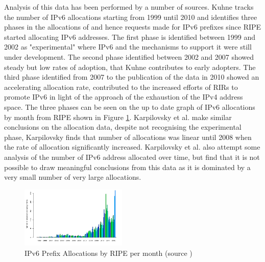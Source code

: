 Analysis of this data has been performed by a number of sources. Kuhne tracks
the number of IPv6 allocations starting from 1999 until 2010 and identifies three
phases in the allocations of and hence requests made for IPv6 prefixes since
RIPE started allocating IPv6 addresses\cite{kuhne_interesting_2010}.
The first phase is identified between 1999 and
2002 as "experimental" where IPv6 and the mechanisms to support it were still
under development. The second phase identified between 2002 and 2007 showed
steady but low rates of adoption, that Kuhne contributes to early adopters. The
third phase identified from 2007 to the publication of the data in 2010 showed
an accelerating allocation rate, contributed to the increased efforts of RIRs
to promote IPv6 in light of the approach of the exhaustion of the IPv4 address
space. The three phases can be seen on the up to date graph of IPv6 allocations
by month from RIPE shown in Figure \ref{fig:alloc-month}. Karpilovsky et al. make
similar conclusions on the allocation data, despite not recognising the
experimental phase, Karpilovsky finds that number of allocations was linear
until 2008 when the rate of allocation significantly increased\cite{karpilovsky_quantifying_2009}.
Karpilovsky et
al. also attempt some analysis of the number of IPv6 address allocated over
time, but find that it is not possible to draw meaningful conclusions from this
data as it is dominated by a very small number of very large allocations.

\begin{figure}[htb]
\centering
\includegraphics[width=0.45\textwidth]{img/v6-alloc-month.png}
\caption{IPv6 Prefix Allocations by RIPE per month (source \protect\cite{ripe_ncc_total_2013})}
\label{fig:alloc-month}
\end{figure}

